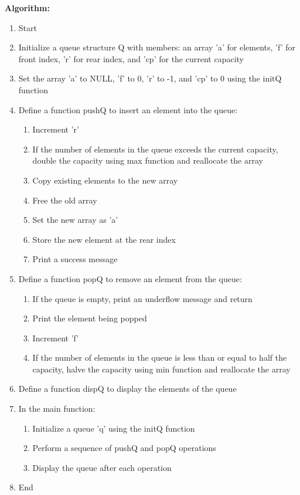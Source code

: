 \documentclass{article}
\begin{document}
\textbf{Algorithm:}
\begin{enumerate}
  \item Start
  \item Initialize a queue structure Q with members: an array 'a' for elements, 'f' for front index, 'r' for rear index, and 'cp' for the current capacity
  \item Set the array 'a' to NULL, 'f' to 0, 'r' to -1, and 'cp' to 0 using the initQ function
  \item Define a function pushQ to insert an element into the queue:
    \begin{enumerate}
      \item Increment 'r'
      \item If the number of elements in the queue exceeds the current capacity, double the capacity using max function and reallocate the array
      \item Copy existing elements to the new array
      \item Free the old array
      \item Set the new array as 'a'
      \item Store the new element at the rear index
      \item Print a success message
    \end{enumerate}
  \item Define a function popQ to remove an element from the queue:
    \begin{enumerate}
      \item If the queue is empty, print an underflow message and return
      \item Print the element being popped
      \item Increment 'f'
      \item If the number of elements in the queue is less than or equal to half the capacity, halve the capacity using min function and reallocate the array
    \end{enumerate}
  \item Define a function dispQ to display the elements of the queue
  \item In the main function:
    \begin{enumerate}
      \item Initialize a queue 'q' using the initQ function
      \item Perform a sequence of pushQ and popQ operations
      \item Display the queue after each operation
    \end{enumerate}
  \item End
\end{enumerate}
\end{document}
